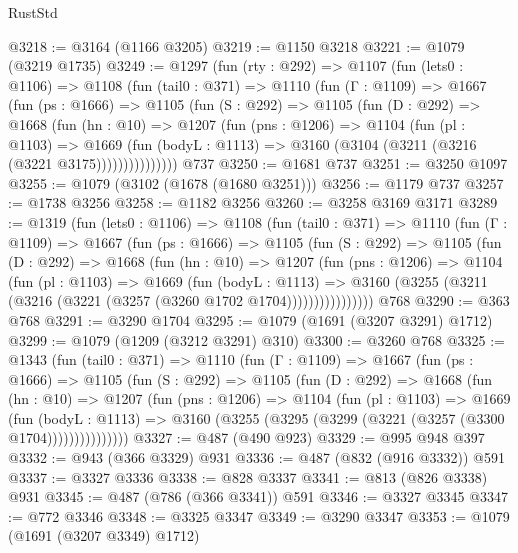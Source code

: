 \begin{lexlean}{RustStd}
\begin{coremodule}
{\begin{coremodule}
{{{{{{{{{{@3218 := @3164 (@1166 @3205)
@3219 := @1150 @3218
@3221 := @1079 (@3219 @1735)
@3249 := @1297
    (fun (rty : @292) =>
    @1107
      (fun (lets0 : @1106) =>
      @1108
        (fun (tail0 : @371) =>
        @1110
          (fun (Γ : @1109) =>
          @1667
            (fun (ps : @1666) =>
            @1105
              (fun (S : @292) =>
              @1105
                (fun (D : @292) =>
                @1668
                  (fun (hn : @10) =>
                  @1207
                    (fun (pns : @1206) =>
                    @1104
                      (fun (pl : @1103) =>
                      @1669
                        (fun (bodyL : @1113) =>
                        @3160 (@3104 (@3211 (@3216 (@3221 @3175)))))))))))))))
    @737
@3250 := @1681 @737
@3251 := @3250 @1097
@3255 := @1079 (@3102 (@1678 (@1680 @3251)))
@3256 := @1179 @737
@3257 := @1738 @3256
@3258 := @1182 @3256
@3260 := @3258 @3169 @3171
@3289 := @1319
    (fun (lets0 : @1106) =>
    @1108
      (fun (tail0 : @371) =>
      @1110
        (fun (Γ : @1109) =>
        @1667
          (fun (ps : @1666) =>
          @1105
            (fun (S : @292) =>
            @1105
              (fun (D : @292) =>
              @1668
                (fun (hn : @10) =>
                @1207
                  (fun (pns : @1206) =>
                  @1104
                    (fun (pl : @1103) =>
                    @1669
                      (fun (bodyL : @1113) =>
                      @3160 (@3255 (@3211 (@3216 (@3221 (@3257 (@3260 @1702 @1704))))))))))))))))
    @768
@3290 := @363 @768
@3291 := @3290 @1704
@3295 := @1079 (@1691 (@3207 @3291) @1712)
@3299 := @1079 (@1209 (@3212 @3291) @310)
@3300 := @3260 @768
@3325 := @1343
    (fun (tail0 : @371) =>
    @1110
      (fun (Γ : @1109) =>
      @1667
        (fun (ps : @1666) =>
        @1105
          (fun (S : @292) =>
          @1105
            (fun (D : @292) =>
            @1668
              (fun (hn : @10) =>
              @1207
                (fun (pns : @1206) =>
                @1104
                  (fun (pl : @1103) =>
                  @1669
                    (fun (bodyL : @1113) =>
                    @3160 (@3255 (@3295 (@3299 (@3221 (@3257 (@3300 @1704)))))))))))))))
@3327 := @487 (@490 @923)
@3329 := @995 @948 @397
@3332 := @943 (@366 @3329) @931
@3336 := @487 (@832 (@916 @3332)) @591
@3337 := @3327 @3336
@3338 := @828 @3337
@3341 := @813 (@826 @3338) @931
@3345 := @487 (@786 (@366 @3341)) @591
@3346 := @3327 @3345
@3347 := @772 @3346
@3348 := @3325 @3347
@3349 := @3290 @3347
@3353 := @1079 (@1691 (@3207 @3349) @1712)
}}}}}}}}}}
\end{coremodule}}
\end{coremodule}
\end{lexlean}
